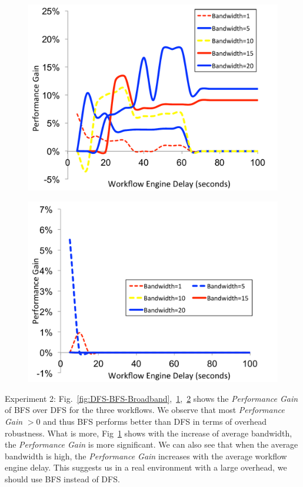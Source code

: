 \documentclass[final]{IEEEtran}
\begin{document}
\begin{figure}[!htb]
\centering
 \includegraphics[width=0.9\linewidth]{figure/DFS-BFS-CyberShake.pdf}
  \label{fig:DFS-BFS-CyberShake}
  \vspace{-10pt}
\end{figure}

\begin{figure}[!htb]
\centering
 \includegraphics[width=0.9\linewidth]{figure/DFS-BFS-Montage.pdf}
  \label{fig:DFS-BFS-Montage}
  \vspace{-10pt}
\end{figure}


Experiment 2: Fig.~\ref{fig:DFS-BFS-Broadband},~\ref{fig:DFS-BFS-CyberShake},~\ref{fig:DFS-BFS-Montage} shows the \emph{Performance Gain} of BFS over DFS for the three workflows. We observe that most  \emph{Performance Gain} $>0$ and thus BFS performs better than DFS in terms of overhead robustness. What is more, Fig~\ref{fig:DFS-BFS-CyberShake} shows with the increase of average bandwidth, the \emph{Performance Gain} is more significant. We can also see that when the average bandwidth is high, the \emph{Performance Gain} increases with the average workflow engine delay. This suggests us in a real environment with a large overhead, we should use BFS instead of DFS. 
\end{document}
